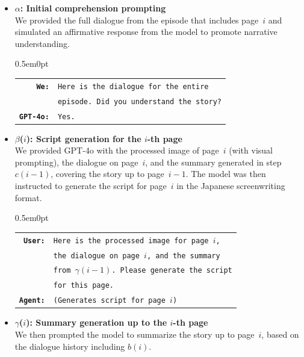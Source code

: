 \documentclass[sigconf, screen, review, anonymous]{acmart}
\begin{document}
\begin{itemize}
    \item \textbf{$\alpha$: Initial comprehension prompting} \\
    We provided the full dialogue from the episode that includes page~$i$ and simulated an affirmative response from the model to promote narrative understanding.

    \begin{adjustwidth}{0.5em}{0pt} %
    \setlength{\tabcolsep}{2pt}
    \begin{tabular}{@{}r l@{}}
    \texttt{\textbf{We:}} & \texttt{Here is the dialogue for the entire} \\
                          & \texttt{episode. Did you understand the story?} \\
    \texttt{\textbf{GPT-4o:}} & \texttt{Yes.} \\
    \end{tabular}
    \end{adjustwidth}

    \item \textbf{$\beta$($i$): Script generation for the $i$-th page} \\
    We provided GPT-4o with the processed image of page~$i$ (with visual prompting), the dialogue on page~$i$, and the summary generated in step $c(i{-}1)$, covering the story up to page~$i{-}1$. The model was then instructed to generate the script for page~$i$ in the Japanese screenwriting format.

    \begin{adjustwidth}{0.5em}{0pt}
    \setlength{\tabcolsep}{2pt}
    \begin{tabular}{@{}r l@{}}
    \texttt{\textbf{User:}} & \texttt{Here is the processed image for page $i$,} \\
                          & \texttt{the dialogue on page $i$, and the summary} \\
                          & \texttt{from $\gamma(i{-}1)$. Please generate the script} \\
                          & \texttt{for this page.} \\
    \texttt{\textbf{Agent:}} & \texttt{(Generates script for page $i$)} \\
    \end{tabular}
    \end{adjustwidth}

    \item \textbf{$\gamma$($i$): Summary generation up to the $i$-th page} \\
    We then prompted the model to summarize the story up to page~$i$, based on the dialogue history including $b(i)$.


\end{itemize}
\end{document}
